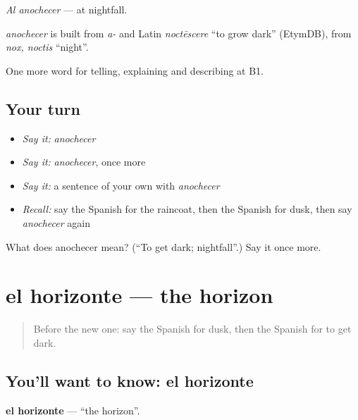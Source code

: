 \emph{Al anochecer} — at nightfall.

\begin{cousinweb}
\emph{anochecer} is built from \emph{a-} and Latin \emph{noctēscere} \textquotedblleft{}to grow dark\textquotedblright{} (EtymDB), from \emph{nox, noctis} \textquotedblleft{}night\textquotedblright{}.
\end{cousinweb}

\begin{grammarlens}[title={What you've built}]
One more word for telling, explaining and describing at B1.
\end{grammarlens}

\subsection*{Your turn}
\begin{itemize}
\raggedright
  \item \emph{Say it:} \emph{anochecer}
  \item \emph{Say it:} \emph{anochecer}, once more
  \item \emph{Say it:} a sentence of your own with \emph{anochecer}
  \item \emph{Recall:} say the Spanish for the raincoat, then the Spanish for dusk, then say \emph{anochecer} again
\end{itemize}

\begin{tcolorbox}[breakable,colback=teal!4,colframe=teal!35!black,title={Before you move on}]
What does anochecer mean? (\textquotedblleft{}To get dark; nightfall\textquotedblright{}.) Say it once more.
\end{tcolorbox}
\section[el horizonte]{el horizonte — the horizon}

\label{lesson:ES-C703-horizonte}



\begin{quote}
Before the new one: say the Spanish for dusk, then the Spanish for to get dark.
\end{quote}

\subsection*{You'll want to know: el horizonte}
\textbf{el horizonte} — \textquotedblleft{}the horizon\textquotedblright{}.

